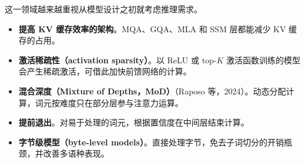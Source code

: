 这一领域越来越重视从模型设计之初就考虑推理需求。
\begin{itemize}
  \item \textbf{提高 KV 缓存效率的架构}。MQA、GQA、MLA 和 SSM 层都能减少 KV 缓存的占用。
  \item \textbf{激活稀疏性（activation sparsity）}。以 ReLU 或 top-$K$ 激活函数训练的模型会产生稀疏激活，可借此加快前馈网络的计算。
  \item \textbf{混合深度（Mixture of Depths，MoD）}（Raposo 等，2024）。动态分配计算，词元按难度只在部分层参与注意力运算。
  \item \textbf{提前退出}。对易于处理的词元，根据置信度在中间层结束计算。
  \item \textbf{字节级模型（byte-level models）}。直接处理字节，免去子词切分的开销瓶颈，并改善多语种表现。
\end{itemize}

